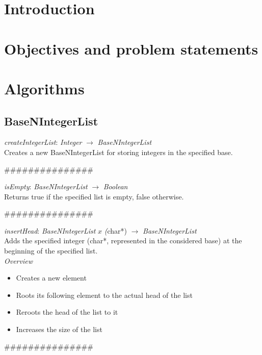 \documentclass[book, backcover, english, report, nodocumentinfo]{upmethodology-document}
\newcommand{\nxtalgo}{\centerline{$$$$\#\#\#\#\#\#\#\#\#\#\#\#\#\#\#$$$$}}
\newcommand{\ov}{\emph{Overview}}
\begin{document}
\chapter*{Introduction}
\tableofcontents
\chapter{Objectives and problem statements}
\chapter{Algorithms}
	\section{BaseNIntegerList}

		\begin{minipage}{\linewidth}
			\emph{createIntegerList}: \emph{Integer} \(\rightarrow\) \emph{BaseNIntegerList}\\
				Creates a new BaseNIntegerList for storing integers in the specified base.
			\label{algo:BNIL-CreateIntegerList}
			
		\end{minipage}
		\nxtalgo

		\begin{minipage}{\linewidth}
			\emph{isEmpty}: \emph{BaseNIntegerList} \(\rightarrow\) \emph{Boolean}\\
				Returns true if the specified list is empty, false otherwise.
			\label{algo:BNIL-IsEmpty}
			
		\end{minipage}
		\nxtalgo

		\begin{minipage}{\linewidth}
			\emph{insertHead}: \emph{BaseNIntegerList} \(x\) \emph(char*) \(\rightarrow\) \emph{BaseNIntegerList}\\
				Adds the specified integer (char*, represented in the considered base) at the beginning of the specified list.\\
			\ov
			\begin{itemize}
				\item Creates a new element
				\item Roots its following element to the actual head of the list
				\item Reroots the head of the list to it
				\item Increases the size of the list
			\end{itemize}
			\label{algo:BNIL-InsertHead}
			
		\end{minipage}
		\nxtalgo
\end{document}
